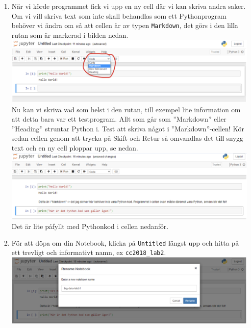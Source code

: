 \documentclass{article}
\begin{document}
\begin{enumerate}
\item När vi körde programmet fick vi upp en ny cell där vi kan skriva andra saker. Om vi vill skriva text som inte skall behandlas som ett Pythonprogram behöver vi ändra om så att cellen är av typen \verb+Markdown+, det görs i den lilla rutan som är markerad i bilden nedan.	\\
  \includegraphics[width=\textwidth]{figures/anaconda5.png}\\
Nu kan vi skriva vad som helst i den rutan, till exempel lite information om att detta bara var ett testprogram. Allt som går som ”Markdown” eller ”Heading” struntar Python i. Test att skriva något i ”Markdown”-cellen! Kör sedan cellen genom att trycka på Skift och Retur så omvandlas det till snygg text och en ny cell ploppar upp, se nedan.\\
  \includegraphics[width=\textwidth]{figures/anaconda6.png}\\
Det är lite påfyllt med Pythonkod i cellen nedanför.
\item För att döpa om din Notebook, klicka på \verb+Untitled+ längst upp och hitta på ett trevligt och informativt namn, ex \verb+cc2018_lab2+.\\
  \includegraphics[width=\textwidth]{figures/anaconda7.png}\\
  \end{enumerate}
\end{document}
